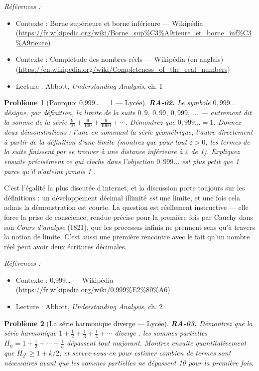 \documentclass[11pt]{article}
\newtheorem{problem}{Problème}
\newenvironment{refs}{\par\small\noindent\emph{Références :}\begin{itemize}\setlength\itemsep{0pt}}{\end{itemize}\normalsize}
\begin{document}
\begin{refs}
\item Contexte : Borne supérieure et borne inférieure --- Wikipédia (\url{https://fr.wikipedia.org/wiki/Borne_sup%C3%A9rieure_et_borne_inf%C3%A9rieure})
\item Contexte : Complétude des nombres réels --- Wikipédia (en anglais) (\url{https://en.wikipedia.org/wiki/Completeness_of_the_real_numbers})
\item Lecture : Abbott, \textit{Understanding Analysis}, ch. 1
\end{refs}

\bigskip

\begin{problem}[{Pourquoi 0,999\dots{} = 1 --- Lycée}]
\textbf{RA-02.} Le symbole $ 0{,}999\ldots $ désigne, par définition, la
limite de la suite $ 0{,}9,\ 0{,}99,\ 0{,}999,\ \dots $ --- autrement dit la somme de la série
$ \frac{9}{10} + \frac{9}{100} + \frac{9}{1000} + \cdots $. Démontrez que
$ 0{,}999\ldots = 1 $. Donnez deux démonstrations : l'une en sommant la série géométrique, l'autre
directement à partir de la définition d'une limite (montrez que pour tout $ \varepsilon > 0 $,
les termes de la suite finissent par se trouver à une distance inférieure à $ \varepsilon $ de 1).
Expliquez ensuite précisément ce qui cloche dans l'objection \og{} $ 0{,}999\ldots $ est plus petit que
1 parce qu'il n'atteint jamais 1 \fg{}.
\end{problem}

\noindent C'est l'égalité la plus discutée d'internet, et la discussion porte toujours sur
les définitions : un développement décimal illimité \textit{est} une limite, et une fois cela admis
la démonstration est courte. La question est réellement instructive --- elle force la prise de
conscience, rendue précise pour la première fois par Cauchy dans son \textit{Cours d'analyse} (1821),
que les processus infinis ne prennent sens qu'à travers la notion de limite. C'est aussi une
première rencontre avec le fait qu'un nombre réel peut avoir deux écritures décimales.

\begin{refs}
\item Contexte : 0,999\dots{} --- Wikipédia (\url{https://fr.wikipedia.org/wiki/0,999%E2%80%A6})
\item Lecture : Abbott, \textit{Understanding Analysis}, ch. 2
\end{refs}

\bigskip

\begin{problem}[{La série harmonique diverge --- Lycée}]
\textbf{RA-03.} Démontrez que la série harmonique
$ 1 + \frac{1}{2} + \frac{1}{3} + \frac{1}{4} + \cdots $ diverge : les sommes partielles
$ H_n = 1 + \frac{1}{2} + \cdots + \frac{1}{n} $ dépassent tout majorant. Montrez ensuite
quantitativement que $ H_{2^k} \ge 1 + k/2 $, et servez-vous-en pour estimer combien de termes
sont nécessaires avant que les sommes partielles ne dépassent 10 pour la première fois.
\end{problem}
\end{document}
